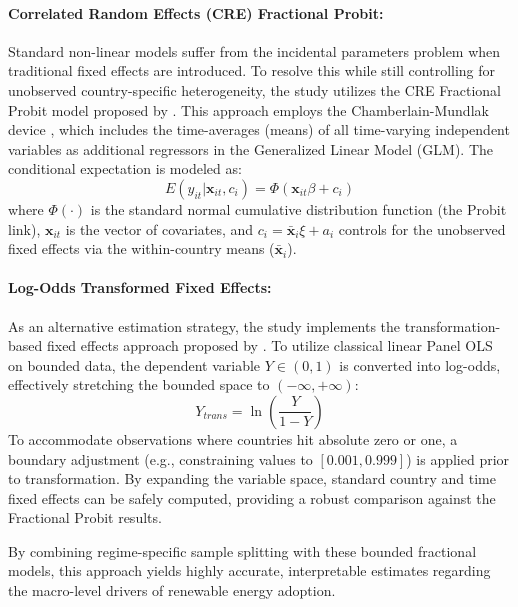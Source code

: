 \documentclass[a4paper,11pt]{article}
\begin{document}
\paragraph{Correlated Random Effects (CRE) Fractional Probit:}
Standard non-linear models suffer from the incidental parameters problem when traditional fixed effects are introduced.
To resolve this while still controlling for unobserved country-specific heterogeneity, the study utilizes the CRE Fractional Probit model proposed by \textcite{papke2008panel}.
This approach employs the Chamberlain-Mundlak device \parencite{mundlak1978}, which includes the time-averages (means) of all time-varying independent variables as additional regressors in the Generalized Linear Model (GLM).
The conditional expectation is modeled as:
\begin{equation}
    E(y_{it} | \mathbf{x}_{it}, c_i) = \Phi(\mathbf{x}_{it}\beta + c_i)
\end{equation}
where $\Phi(\cdot)$ is the standard normal cumulative distribution function (the Probit link), $\mathbf{x}_{it}$ is the vector of covariates, and $c_i = \bar{\mathbf{x}}_i \xi + a_i$ controls for the unobserved fixed effects via the within-country means ($\bar{\mathbf{x}}_i$).

\paragraph{Log-Odds Transformed Fixed Effects:}
As an alternative estimation strategy, the study implements the transformation-based fixed effects approach proposed by \textcite{ramalho2017}.
To utilize classical linear Panel OLS on bounded data, the dependent variable $Y \in (0, 1)$ is converted into log-odds, effectively stretching the bounded space to $(-\infty, +\infty)$:
\begin{equation}
    Y_{trans} = \ln\left(\frac{Y}{1 - Y}\right)
\end{equation}
To accommodate observations where countries hit absolute zero or one, a boundary adjustment (e.g., constraining values to $[0.001, 0.999]$) is applied prior to transformation.
By expanding the variable space, standard country and time fixed effects can be safely computed, providing a robust comparison against the Fractional Probit results.

By combining regime-specific sample splitting with these bounded fractional models, this approach yields highly accurate, interpretable estimates regarding the macro-level drivers of renewable energy adoption.
\end{document}
